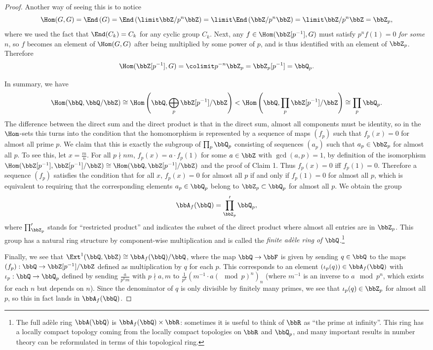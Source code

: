 \begin{proof}
    Another way of seeing this is to notice
    \[\Hom(G,G)=\End\left(G\right)=\End\left(\limit \bbZ\slash p^n\bbZ \right)=\limit \End\left(\bbZ\slash p^n\bbZ \right)=\limit \bbZ\slash p^n\bbZ=\bbZ_p,\]
    where we used the fact that $\End(C_k)=C_k$ for any cyclic group $C_k$. Next, any $f\in \Hom(\bbZ[p^{-1}],G)$ must satisfy $p^nf(1)=0$ \emph{for some $n$}, so $f$ becomes an element of $\Hom(G,G)$ after being multiplied by some power of $p$, and is thus identified with an element of $\bbZ_p$. Therefore
    \[\Hom(\bbZ[p^{-1}],G)=\colimit p^{-n}\bbZ_p=\bbZ_p[p^{-1}]=\bbQ_p.\]

    In summary, we have
    \[\Hom(\bbQ,\bbQ\slash\bbZ)\cong \Hom\left(\bbQ,\bigoplus_p \bbZ[p^{-1}]\slash \bbZ\right)< \Hom\left(\bbQ,\prod_p \bbZ[p^{-1}]\slash \bbZ\right)\cong \prod_p \bbQ_p.\]
    The difference between the direct sum and the direct product is that in the direct sum, almost all components must be identity, so in the $\Hom$-sets this turns into the condition that the homomorphism is represented by a sequence of maps $(f_p)$ such that $f_p(x)=0$ for almost all prime $p$. We claim that this is exactly the subgroup of $\prod_p\bbQ_p$ consisting of sequences $(a_p)$ such that $a_p\in\bbZ_p$ for almost all $p$. To see this, let $x=\frac mn$. For all $p\nmid nm$, $f_p(x)=a\cdot f_p(1)$ for some $a\in\bbZ$ with $\gcd(a,p)=1$, by definition of the isomorphism $\Hom(\bbZ[p^{-1}],\bbZ[p^{-1}]\slash \bbZ)\cong \Hom(\bbQ,\bbZ[p^{-1}]\slash\bbZ)$ and the proof of Claim 1. Thus $f_p(x)=0$ iff $f_p(1)=0$. Therefore a sequence $(f_p)$ satisfies the condition that for all $x$, $f_p(x)=0$ for almost all $p$ if and only if $f_p(1)=0$ for almost all $p$, which is equivalent to requiring that the corresponding elements $a_p\in \bbQ_p$ belong to $\bbZ_p\subset \bbQ_p$ for almost all $p$. We obtain the group
    \[\bbA_f(\bbQ)=\prod_{\bbZ_p}^\prime \bbQ_p,\]
    where $\prod^\prime_{\bbZ_p}$ stands for ``restricted product'' and indicates the subset of the direct product where almost all entries are in $\bbZ_p$. This group has a natural ring structure by component-wise multiplication and is called the \emph{finite ad\`ele ring of $\bbQ$}.\footnote{The full ad\`ele ring $\bbA(\bbQ)$ is $\bbA_f(\bbQ)\times \bbR$: sometimes it is useful to think of $\bbR$ as ``the prime at infinity''. This ring has a locally compact topology coming from the locally compact topologies on $\bbR$ and $\bbQ_p$, and many important results in number theory can be reformulated in terms of this topological ring.}
    
    Finally, we see that $\Ext^1(\bbQ,\bbZ)\cong \bbA_f(\bbQ)\slash \bbQ$, where the map $\bbQ\to \bbF$ is given by sending $q\in\bbQ$ to the maps $(f_p):\bbQ\to \bbZ[p^{-1}]\slash\bbZ$ defined as multiplication by $q$ for each $p$. This corresponds to an element $(\iota_p(q)) \in \bbA_f(\bbQ)$ with $\iota_p:\bbQ\to \bbQ_p$ defined by sending $\frac{a}{p^k m}$ with $p\nmid a,m$ to $\frac{1}{p^k}\left(m^{-1}\cdot a(\mod p)^n\right)_n$ (where $m^{-1}$ is an inverse to $a \mod p^n$, which exists for each $n$ but depends on $n$). Since the denominator of $q$ is only divisible by finitely many primes, we see that $\iota_p(q)\in\bbZ_p$ for almost all $p$, so this in fact lands in $\bbA_f(\bbQ)$. 
\end{proof}
